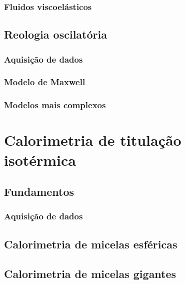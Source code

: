 			\subsection{Fluidos viscoelásticos}
			
			
		\section{Reologia oscilatória}
			\subsection{Aquisição de dados}
			\subsection{Modelo de Maxwell}
			\subsection{Modelos mais complexos}
	\chapter{Calorimetria de titulação isotérmica}
		\section{Fundamentos}
			\subsection{Aquisição de dados}
		\section{Calorimetria de micelas esféricas}
		\section{Calorimetria de micelas gigantes}
